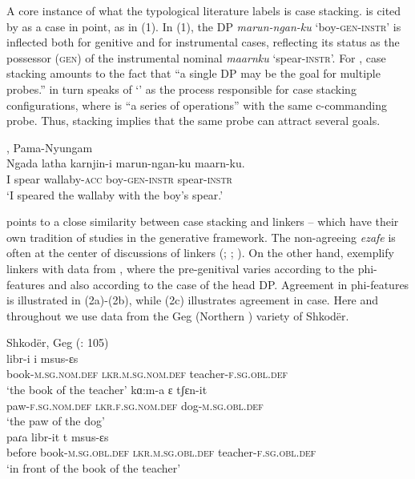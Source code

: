 \documentclass[output=paper]{langsci/langscibook}
\begin{document}
A core instance of what the typological literature labels  \citep{Plank1995} is case stacking.  is cited by \citet{Richards2013} as a case in point, as in (1). In (1), the DP \textit{marun-ngan-ku} ‘boy-\textsc{gen-instr}’ is inflected both for genitive and for instrumental cases, reflecting its status as the possessor (\textsc{gen}) of the instrumental nominal \textit{maarnku} ‘spear-\textsc{instr}’. For \citet[62]{Merchant2006}, case stacking amounts to the fact that “a single DP may be the goal for multiple probes.” \citet{Richards2013} in turn speaks of ‘’ as the process responsible for case stacking configurations, where  is “a series of  operations” with the same c-commanding probe. Thus, stacking implies that the same probe can attract several goals.

\ea%
, Pama-Nyungam \citep[43]{Richards2013}\\
\gll  Ngada latha   karnjin-i   marun-ngan-ku   maarn-ku.\\
I   spear   wallaby-\textsc{acc} boy-\textsc{gen-instr}  spear-\textsc{instr}\\
\glt ‘I speared the wallaby with the boy’s spear.’        
\z

\citet{Plank1995} points to a close similarity between case stacking and linkers – which have their own tradition of studies in the generative framework. The non-agreeing  \textit{ezafe} is often at the center of discussions of linkers (\citealt{Dikken2004}; \citealt{Larson2008}; \citealt{Richards2010}). On the other hand, \citet{Franco2015} exemplify linkers with data from , where the pre-genitival  varies according to the phi-features and also according to the case of the head DP. Agreement in phi-features is illustrated in (2a)-(2b), while (2c) illustrates agreement in case. Here and throughout we use data from the Geg (Northern ) variety of Shkodër.

\ea%
    Shkodër, Geg   (\citealt{Manzini2011Reducing}: 105)\label{ex:manzini:2}\\
    \ea
    \gll libr-i          i       msus-ɛs   \\
            book-\textsc{m.sg.nom.def}  \textsc{lkr.m.sg.nom.def}   teacher-\textsc{f.sg.obl.def} \\
    \glt    ‘the book of the teacher’
    \ex
    \gll kɑ:m-a      ɛ          tʃɛn-it                \\
         paw-\textsc{f.sg.nom.def}   \textsc{lkr.f.sg.nom.def}  dog-\textsc{m.sg.obl.def}  \\
    \glt ‘the paw of the dog’\\
    \ex
    \gll paɾa     libr-it       t       msus-ɛs\\
         before   book-\textsc{m.sg.obl.def}  \textsc{lkr.m.sg.obl.def}  teacher-\textsc{f.sg.obl.def}\\
    \glt ‘in front of the book of the teacher’ 
    \z
\z 
\end{document}
